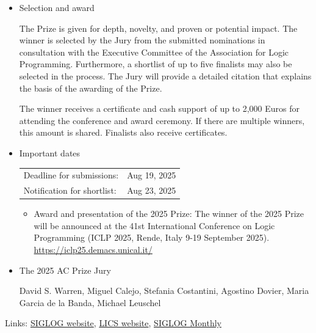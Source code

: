\documentclass[prodmode,acmtecs]{acmsmall} %
\begin{document}
\begin{itemize}
\item  Selection and award 
 
  The Prize is given for depth, novelty, and proven or potential impact. The winner is selected by the Jury from the submitted nominations in consultation with the Executive Committee of the Association for Logic Programming. Furthermore, a shortlist of up to five finalists may also be selected in the process. The Jury will provide a detailed citation that explains the basis of the awarding of the Prize. 
 
  The winner receives a certificate and cash support of up to 2,000 Euros for attending the conference and award ceremony. If there are multiple winners, this amount is shared. Finalists also receive certificates. 
 
\item  Important dates 
 
\begin{tabulary}{\linewidth}{LL}Deadline for submissions:  & Aug 19, 2025 \\
Notification for shortlist:  & Aug 23, 2025 \\
\end{tabulary}
 
\begin{itemize}\item  Award and presentation of the 2025 Prize: The winner of the 2025 Prize will be announced at the 41st International Conference on Logic Programming (ICLP 2025, Rende, Italy 9-19 September 2025). \href{https://iclp25.demacs.unical.it/}{https://iclp25.demacs.unical.it/}
\end{itemize} 
\item  The 2025 AC Prize Jury 
 
  David S. Warren, Miguel Calejo, Stefania Costantini, Agostino Dovier, Maria Garcia de la Banda, Michael Leuschel 
 
\end{itemize}


\bigskip Links: \href{http://siglog.org/}{SIGLOG website}, \href{https://lics.siglog.org}{LICS website}, \href{https://lics.siglog.org/newsletters/}{SIGLOG Monthly}
\end{document}
